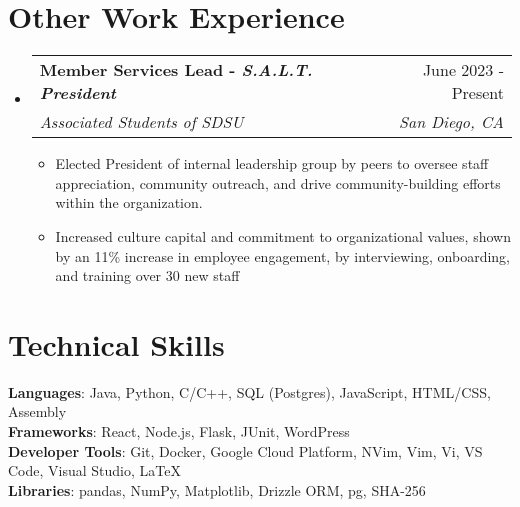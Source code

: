 \documentclass[letterpaper,11pt]{article}
\makeatletter
\newcommand{\resumeItem}[1]{
  \item\small{
    {#1 \vspace{-2pt}}
  }
}
\newcommand{\resumeSubheading}[4]{
  \vspace{-2pt}\item
    \begin{tabular*}{0.97\textwidth}[t]{l@{\extracolsep{\fill}}r}
      \textbf{#1} & #2 \\
      \textit{\small#3} & \textit{\small #4} \\
    \end{tabular*}\vspace{-7pt}
}
\newcommand{\resumeSubHeadingListStart}{\begin{itemize}[leftmargin=0.15in, label={}]}
\newcommand{\resumeSubHeadingListEnd}{\end{itemize}}
\newcommand{\resumeItemListStart}{\begin{itemize}}
\newcommand{\resumeItemListEnd}{\end{itemize}\vspace{-5pt}}
\makeatother
\begin{document}
\section{Other Work Experience}

    \resumeSubHeadingListStart
        \resumeSubheading{Member Services Lead - \textnormal{\textit{S.A.L.T. President}}}{June 2023 - Present}
        {Associated Students of SDSU}{San Diego, CA}
        \resumeItemListStart
            \resumeItem{Elected President of internal leadership group by peers to oversee staff appreciation, community outreach, and drive community-building efforts within the organization.}
            \resumeItem{Increased culture capital and commitment to organizational values, shown by an 11\% increase in employee engagement, by interviewing, onboarding, and training over 30 new staff}
        \resumeItemListEnd
    \resumeSubHeadingListEnd

%
\section{Technical Skills}
 \begin{itemize}[leftmargin=0.15in, label={}]
    \small{\item{
     \textbf{Languages}{: Java, Python, C/C++, SQL (Postgres), JavaScript, HTML/CSS, Assembly} \\
     \textbf{Frameworks}{: React, Node.js, Flask, JUnit, WordPress} \\
     \textbf{Developer Tools}{: Git, Docker, Google Cloud Platform, NVim, Vim, Vi, VS Code, Visual Studio, LaTeX} \\
     \textbf{Libraries}{: pandas, NumPy, Matplotlib, Drizzle ORM, pg, SHA-256}
    }}
 \end{itemize}


\end{document}
